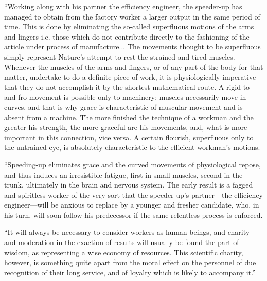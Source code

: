 \documentclass{book}
\begin{document}
“Working along with his partner the efficiency engineer, the speeder-up has managed to obtain from the factory worker a larger output in the same period of time. This is done by eliminating the so-called superfluous motions of the arms and lingers i.e. those which do not contribute directly to the fashioning of the article under process of manufacture... The movements thought to be superfluous simply represent Nature’s attempt to rest the strained and tired muscles. Whenever the muscles of the arms and fingers, or of any part of the body for that matter, undertake to do a definite piece of work, it is physiologically imperative that they do not accomplish it by the shortest mathematical route. A rigid to-and-fro movement is possible only to machinery; muscles necessarily move in curves, and that is why grace is characteristic of muscular movement and is absent from a machine. The more finished the technique of a workman and the greater his strength, the more graceful are his movements, and, what is more important in this connection, vice versa. A certain flourish, superfluous only to the untrained eye, is absolutely characteristic to the efficient workman’s motions.

“Speeding-up eliminates grace and the curved movements of physiological repose, and thus induces an irresistible fatigue, first in small muscles, second in the trunk, ultimately in the brain and nervous system. The early result is a fagged and spiritless worker of the very sort that the speeder-up’s partner—the efficiency engineer—will be anxious to replace by a younger and fresher candidate, who, in his turn, will soon follow his predecessor if the same relentless process is enforced.

“It will always be necessary to consider workers as human beings, and charity and moderation in the exaction of results will usually be found the part of wisdom, as representing a wise economy of resources. This scientific charity, however, is something quite apart from the moral effect on the personnel of due recognition of their long service, and of loyalty which is likely to accompany it.”\footnotemark[4]
\end{document}
